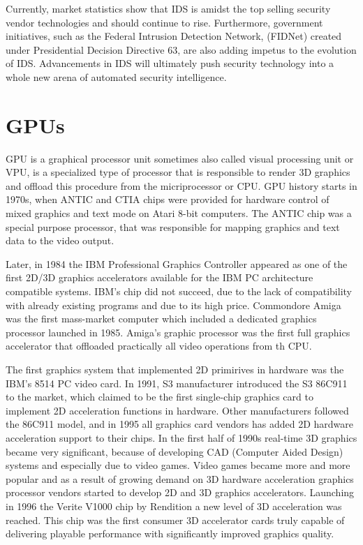 \documentclass[thesis=M,english]{FITthesis}[2011/07/15]
\begin{document}
Currently, market statistics show that IDS is amidst the top selling security vendor technologies and should continue to rise. Furthermore, government initiatives, such as the Federal Intrusion Detection Network, (FIDNet) created under Presidential Decision Directive 63, are also adding impetus to the evolution of IDS. Advancements in IDS will ultimately push security technology into a whole new arena of automated security intelligence.

\section{GPUs}
GPU is a graphical processor unit sometimes also called visual processing unit or VPU, is a specialized type of processor that is responsible to render 3D graphics and offload this procedure from the micriprocessor or CPU. GPU history starts in 1970s, when ANTIC and CTIA chips were provided for hardware control of mixed graphics and text mode on Atari 8-bit computers. The ANTIC chip was a special purpose processor, that was responsible for mapping graphics and text data to the video output.

Later, in 1984 the IBM Professional Graphics Controller appeared as one of the first 2D/3D graphics accelerators available for the IBM PC architecture compatible systems. IBM’s chip did not succeed, due to the lack of compatibility with already existing programs and due to its high price. Commondore Amiga was the first mass-market computer which included a dedicated graphics processor launched in 1985. Amiga's graphic processor was the first full graphics accelerator that offloaded practically all video operations from th CPU.

The first graphics system that implemented 2D primirives in hardware was the IBM's 8514 PC video card. In 1991, S3 manufacturer introduced the S3 86C911 to the market, which claimed to be the first single-chip graphics card to implement 2D acceleration functions in hardware. Other manufacturers followed the 86C911 model, and in 1995 all graphics card vendors has added 2D hardware acceleration support to their chips. In the first half of 1990s real-time 3D graphics became very significant, because of developing CAD (Computer Aided Design) systems and especially due to video games. Video games became more and more popular and as a result of growing demand on 3D hardware acceleration graphics processor vendors started to develop 2D and 3D graphics accelerators. Launching in 1996 the Verite V1000 chip by Rendition a new level of 3D acceleration was reached. This chip was the first consumer 3D accelerator cards truly capable of delivering playable performance with significantly improved graphics quality.
\end{document}
